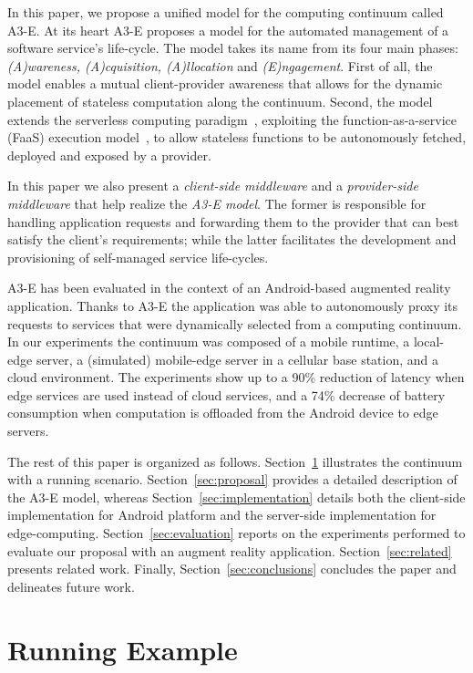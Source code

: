 In this paper, we propose a unified model for the computing continuum called A3-E. At its heart A3-E proposes a model for the automated management of a software service's life-cycle. The model takes its name from its four main phases: \textit{(A)wareness, (A)cquisition, (A)llocation} and \textit{(E)ngagement}. First of all, the model enables a mutual client-provider awareness that allows for the dynamic placement of stateless computation along the continuum. Second, the model extends the serverless computing paradigm~\cite{Hendrickson:2016,baldini2017serverless,GarrigaMendonca2017}, exploiting the function-as-a-service (FaaS) execution model~\cite{MateosFaaster17}, to allow stateless functions to be autonomously fetched, deployed and exposed by a provider. 

In this paper we also present a \textit{client-side middleware} and a \textit{provider-side middleware} that help realize the \textit{A3-E model}. The former is responsible for handling application requests and forwarding them to the provider that can best satisfy the client's requirements; while the latter facilitates the development and provisioning of self-managed service life-cycles. 

A3-E has been evaluated in the context of an Android-based augmented reality application. Thanks to A3-E the application was able to autonomously proxy its requests to services that were dynamically selected from a computing continuum. In our experiments the continuum was composed of a mobile runtime, a local-edge server, a (simulated) mobile-edge server in a cellular base station, and a cloud environment. The experiments show up to a 90\% reduction of latency when edge services are used instead of cloud services, and a 74\% decrease of battery consumption when computation is offloaded from the Android device to edge servers. 

The rest of this paper is organized as follows.  Section~\ref{sec:example} illustrates the continuum with a running scenario. Section~\ref{sec:proposal} provides a detailed description of the A3-E model, whereas Section~\ref{sec:implementation} details both the client-side implementation for Android platform and the server-side implementation for edge-computing. Section~\ref{sec:evaluation} reports on the experiments performed to evaluate our proposal with an augment reality application. Section~\ref{sec:related} presents related work. Finally, Section~\ref{sec:conclusions} concludes the paper and delineates future work.

\section{Running Example}
\label{sec:example}

